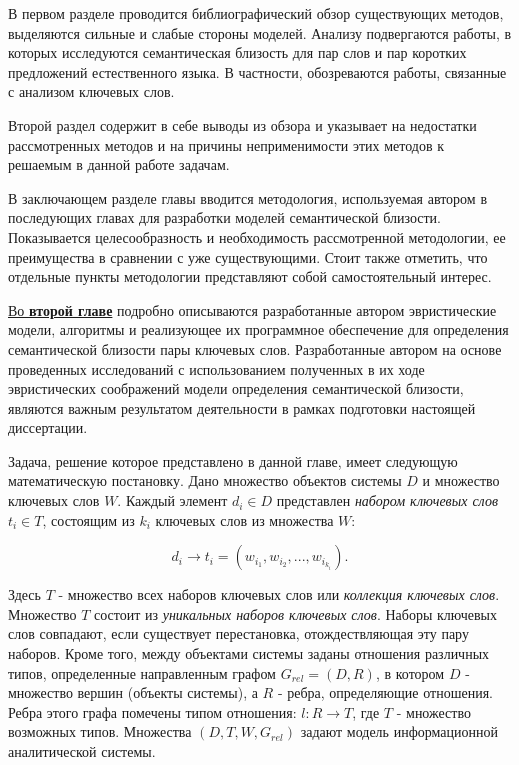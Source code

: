 В первом разделе проводится библиографический обзор существующих методов, выделяются сильные и слабые стороны моделей. Анализу подвергаются работы, в которых исследуются семантическая близость для пар слов и пар коротких предложений естественного языка. В частности, обозреваются работы, связанные с анализом ключевых слов.

Второй раздел содержит в себе выводы из обзора и указывает на недостатки рассмотренных методов и на причины неприменимости этих методов к решаемым в данной работе задачам.

В заключающем разделе главы вводится методология, используемая автором в последующих главах для разработки моделей семантической близости. Показывается целесообразность и необходимость рассмотренной методологии, ее преимущества в сравнении с уже существующими. Стоит также отметить, что отдельные пункты методологии представляют собой самостоятельный интерес.


\underline{Во \textbf{второй главе}} подробно описываются разработанные автором эвристические модели, алгоритмы и реализующее их программное обеспечение для определения семантической близости пары ключевых слов. Разработанные автором на основе проведенных исследований с использованием полученных в их ходе эвристических соображений модели определения семантической близости, являются важным результатом деятельности в рамках подготовки настоящей диссертации.

Задача, решение которое представлено в данной главе, имеет следующую математическую постановку. Дано множество объектов системы $D$ и множество ключевых слов $W$. Каждый элемент $d_i \in D$ представлен \emph{набором ключевых слов} $t_i \in T$, состоящим из  $k_i$ ключевых слов из множества $W$:

$$d_i\rightarrow t_i = (w_{i_1},w_{i_2},...,w_{i_{k_i}}).$$

Здесь $T$ - множество всех наборов ключевых слов или \emph{коллекция ключевых слов}. Множество $T$ состоит из \emph{уникальных наборов ключевых слов}. Наборы ключевых слов совпадают, если существует перестановка, отождествляющая эту пару наборов. Кроме того, между объектами системы заданы отношения различных типов, определенные направленным графом $G_{rel} = (D, R)$, в котором $D$ - множество вершин (объекты системы), а $R$ - ребра, определяющие отношения. Ребра этого графа помечены типом отношения: $l: R \rightarrow T$, где $T$ - множество возможных типов.  Множества $(D, T, W, G_{rel})$ задают модель информационной аналитической системы.

